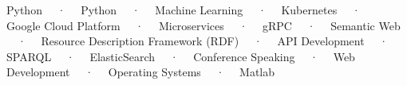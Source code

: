 \begin{cventries}
    
    \cventry
        {}
        {}
        {}
        {}
        {\vspace{-1em}
            \begin{cvitems}
                \item{Python ~~·~~ Python ~~·~~ Machine Learning ~~·~~ Kubernetes ~~·~~ Google Cloud Platform ~~·~~ Microservices ~~·~~ gRPC ~~·~~ Semantic Web ~~·~~ Resource Description Framework (RDF) ~~·~~ API Development ~~·~~ SPARQL ~~·~~ ElasticSearch ~~·~~ Conference Speaking ~~·~~ Web Development ~~·~~ Operating Systems ~~·~~ Matlab}
            \end{cvitems}
        }
        \vspace{-0.2cm}

\end{cventries}